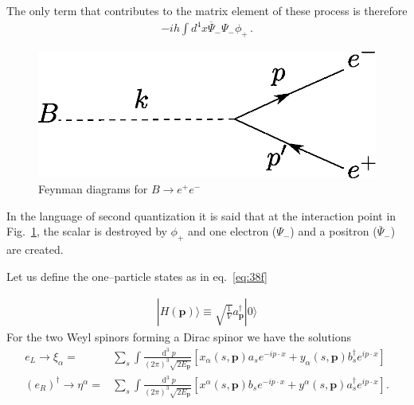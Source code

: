 The only term that contributes to the matrix element of these process is therefore
\begin{align}
  \label{eq:97f}
  -i h \int d^4x\overline{\Psi}_-\Psi_-\phi_+\,.
\end{align}

\begin{figure} %
  \centering %
  \includegraphics[scale=0.6]{Btoee} %
  \caption{Feynman diagrams for $B\to e^+ e^-$} %
  \label{fig:btoee} %
\end{figure} %
In the language of second quantization it is said that at the interaction point in Fig.~\ref{fig:btoee}, the scalar is destroyed by $\phi_+$ and one electron ($\Psi_-$) and a positron ($\bar{\Psi}_{-}$) are created.

Let us define the one--particle states as in eq.~\eqref{eq:38f}

\begin{align}
  | H(\mathbf{p})\rangle\equiv\sqrt{\frac{1}{V}}a^\dagger_{\mathbf{p}}|0\rangle 
\end{align}
For the two Weyl spinors forming a Dirac spinor we have the solutions
\begin{align}
 e_L\to \xi_{\alpha}=&\sum_s\int \frac{\operatorname{d}^3p}{(2\pi)^3\sqrt{2E_{\mathbf{p}}}} \left[ x_{\alpha}\left(s,\mathbf{p}\right) a_s e^{-i p\cdot x}+y_{\alpha}\left(s,\mathbf{p}\right) b_s^{\dagger} e^{i p\cdot x}  \right]\nonumber\\
 \left( e_R \right)^{\dagger}\to \eta^{\alpha}=&\sum_s\int \frac{\operatorname{d}^3p}{(2\pi)^3\sqrt{2E_{\mathbf{p}}}} \left[ x^{\alpha}\left(s,\mathbf{p}\right) b_s e^{-i p\cdot x}+y^{\alpha}\left(s,\mathbf{p}\right) a_s^{\dagger} e^{i p\cdot x}  \right].
\end{align}


